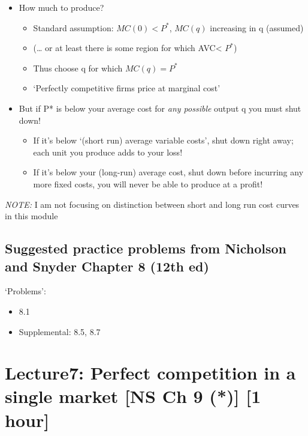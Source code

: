 \documentclass[]{article}
\providecommand{\tightlist}{%
  \setlength{\itemsep}{0pt}\setlength{\parskip}{0pt}}
\begin{document}
\begin{itemize}
\tightlist
\item
  How much to produce?

  \begin{itemize}
  \tightlist
  \item
    Standard assumption: \(MC(0)<P^*\), \(MC(q)\) increasing in q
    (assumed)
  \item
    (\ldots{} or at least there is some region for which AVC\textless{}
    \(P^*\))
  \item
    Thus choose q for which \(MC(q) = P^*\)
  \item
    `Perfectly competitive firms price at marginal cost'
  \end{itemize}
\item
  But if P* is below your average cost for \emph{any possible} output q
  you must shut down!

  \begin{itemize}
  \tightlist
  \item
    If it's below `(short run) average variable costs', shut down right
    away; each unit you produce adds to your loss!
  \item
    If it's below your (long-run) average cost, shut down before
    incurring any more fixed costs, you will never be able to produce at
    a profit!
  \end{itemize}
\end{itemize}

\emph{NOTE:} I am not focusing on distinction between short and long run
cost curves in this module

\hypertarget{suggested-practice-problems-from-nicholson-and-snyder-chapter-8-12th-ed}{%
\subsection{Suggested practice problems from Nicholson and Snyder
Chapter 8 (12th
ed)}\label{suggested-practice-problems-from-nicholson-and-snyder-chapter-8-12th-ed}}

`Problems':

\begin{itemize}
\tightlist
\item
  8.1
\item
  Supplemental: 8.5, 8.7
\end{itemize}

\hypertarget{lecture7-perfect-competition-in-a-single-market-ns-ch-9-1-hour}{%
\section{Lecture7: Perfect competition in a single market {[}NS Ch 9
(*){]} {[}1
hour{]}}\label{lecture7-perfect-competition-in-a-single-market-ns-ch-9-1-hour}}
\end{document}

